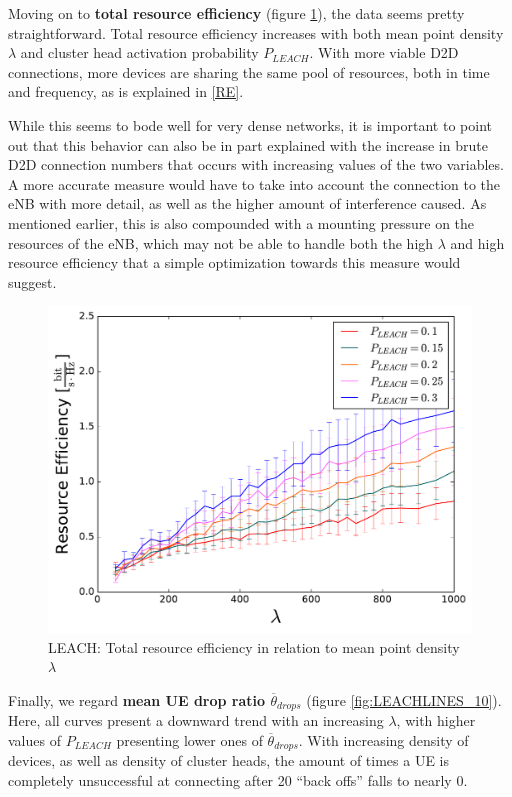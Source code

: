 Moving on to \textbf{total resource efficiency} (figure \ref{fig:LEACHLINES_9}), the data seems pretty straightforward. Total resource efficiency increases with both mean point density $\lambda$ and cluster head activation probability $P_{LEACH}$. With more viable D2D connections, more devices are sharing the same pool of resources, both in time and frequency, as is explained in \ref{RE}.

While this seems to bode well for very dense networks, it is important to point out that this behavior can also be in part explained with the increase in brute D2D connection numbers that occurs with increasing values of the two variables. A more accurate measure would have to take into account the connection to the eNB with more detail, as well as the higher amount of interference caused. As mentioned earlier, this is also compounded with a mounting pressure on the resources of the eNB, which may not be able to handle both the high $\lambda$ and high resource efficiency that a simple optimization towards this measure would suggest.

\begin{figure}
\centering
\captionsetup{justification=centering}
\includegraphics[width=0.7\linewidth]{figures/LEACHLINES_9}
\caption{LEACH: Total resource efficiency in relation to mean point density $\lambda$ }
\label{fig:LEACHLINES_9}
\end{figure}

Finally, we regard \textbf{mean UE drop ratio $\overline{\theta}_{drops}$} (figure \ref{fig:LEACHLINES_10}). Here, all curves present a downward trend with an increasing $\lambda$, with higher values of $P_{LEACH}$ presenting lower ones of $\overline{\theta}_{drops}$. With increasing density of devices, as well as density of cluster heads, the amount of times a UE is completely unsuccessful at connecting after 20 ``back offs'' falls to nearly 0. 

